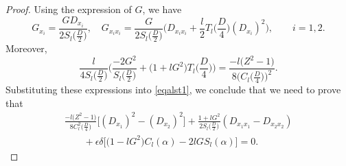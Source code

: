 \documentclass[10pt,a4paper]{amsart}
\numberwithin{equation}{section}
\begin{document}
\begin{proof}
Using the expression of $G$, we have
\[
G_{x_i}=\frac{G D_{x_i}}{2S_l\bigl(\frac{D}{2}\bigr)},
\quad
G_{x_ix_i}=\frac{G}{2S_l\bigl(\frac{D}{2}\bigr)}\biggl( D_{x_ix_i}+\frac{l}{2}T_l\biggl(\frac{D}{4}\biggr) (D_{x_i})^2 \biggr), \qquad i=1,2.
\]
Moreover,
\[
\frac{l}{4S_l\bigl(\frac{D}{2}\bigr)}\biggl(\frac{-2G^2}{S_l\bigl(\frac{D}{2}\bigr)}+\bigl(1+l G^2\bigr)
T_l\biggl(\frac{D}{4}\biggr)\biggr)= \frac{-l\bigl(Z^2-1\bigr)}{8\bigl(C_l\bigl(\frac{D}{4}\bigr)\bigr)^2}.
\]
Substituting these expressions into \eqref{eqalst1}, we conclude that we need to prove that
\begin{gather}
\frac{-l\bigl(Z^2-1\bigr)}{8C_l^2\bigl(\frac{D}{4}\bigr)} \bigl[(D_{x_1})^2-(D_{x_2})^2\bigr]+
\frac{1+l G^2}{2S_l\bigl(\frac{D}{2}\bigr)}(D_{x_1x_1}-D_{x_2x_2})\nonumber\\
\qquad{}+\epsilon\delta \bigl[ \bigl(1-l G^2\bigr)C_l(\alpha)-2l G S_l(\alpha)\bigr]=0.\label{eqalst3}
\end{gather}


\end{proof}
\end{document}
